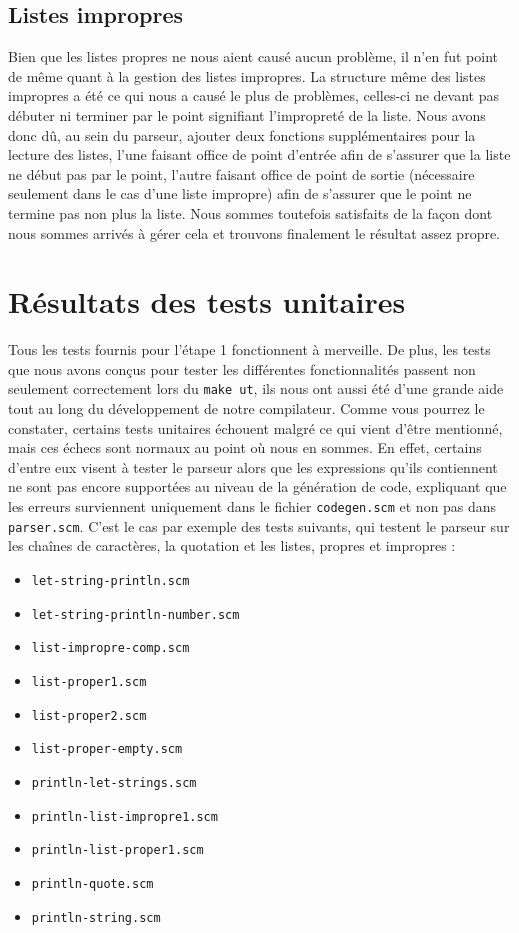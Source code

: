 \documentclass[12pt]{article}
\begin{document}
\subsection{Listes impropres}
Bien que les listes propres ne nous aient causé aucun problème, il n'en fut point de même quant à la gestion des listes impropres. La structure même des listes impropres a été ce qui nous a causé le plus de problèmes, celles-ci ne devant pas débuter ni terminer par le point signifiant l'impropreté de la liste. Nous avons donc dû, au sein du parseur, ajouter deux fonctions supplémentaires pour la lecture des listes, l'une faisant office de point d'entrée afin de s'assurer que la liste ne début pas par le point, l'autre faisant office de point de sortie (nécessaire seulement dans le cas d'une liste impropre) afin de s'assurer que le point ne termine pas non plus la liste. Nous sommes toutefois satisfaits de la façon dont nous sommes arrivés à gérer cela et trouvons finalement le résultat assez propre.


\section{Résultats des tests unitaires}
Tous les tests fournis pour l'étape 1 fonctionnent à merveille. De plus, les tests que nous avons conçus pour tester les différentes fonctionnalités passent non seulement correctement lors du \texttt{make ut}, ils nous ont aussi été d'une grande aide tout au long du développement de notre compilateur. Comme vous pourrez le constater, certains tests unitaires échouent malgré ce qui vient d'être mentionné, mais ces échecs sont normaux au point où nous en sommes. En effet, certains d'entre eux visent à tester le parseur alors que les expressions qu'ils contiennent ne sont pas encore supportées au niveau de la génération de code, expliquant que les erreurs surviennent uniquement dans le fichier \texttt{codegen.scm} et non pas dans \texttt{parser.scm}. C'est le cas par exemple des tests suivants, qui testent le parseur sur les chaînes de caractères, la quotation et les listes, propres et impropres :

\begin{itemize}
\item \texttt{let-string-println.scm}
\item \texttt{let-string-println-number.scm}
\item \texttt{list-impropre-comp.scm}
\item \texttt{list-proper1.scm}
\item \texttt{list-proper2.scm}
\item \texttt{list-proper-empty.scm}
\item \texttt{println-let-strings.scm}
\item \texttt{println-list-impropre1.scm}
\item \texttt{println-list-proper1.scm}
\item \texttt{println-quote.scm}
\item \texttt{println-string.scm}
\end{itemize}
\end{document}
